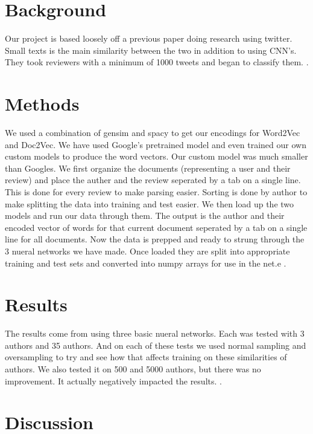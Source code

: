 \documentclass[conference]{IEEEtran}
\begin{document}
\section{Background}

Our project is based loosely off a previous paper doing research using twitter. Small texts is the main similarity between the two in addition to using CNN's. They took reviewers with a minimum of 1000 tweets and began to classify them. \cite{b2}.

\section{Methods}
We used a combination of gensim and spacy to get our encodings for Word2Vec and Doc2Vec. We have used Google's pretrained model and even trained our own custom models to produce the word vectors. Our custom model was much smaller than Googles. We first organize the documents (representing a user and their review) and place the auther and the review seperated by a tab on a single line. This is done for every review to make parsing easier. Sorting is done by author to make splitting the data into training and test easier. We then load up the two models and run our data through them. The output is the author and their encoded vector of words for that current document seperated by a tab on a single line for all documents. Now the data is prepped and ready to strung through the 3 nueral networks we have made. Once loaded they are split into appropriate training and test sets and converted into numpy arrays for use in the net.e \cite{b3}.

\section{Results}

The results come from using three basic nueral networks. Each was tested with 3 authors and 35 authors. And on each of these tests we used normal sampling and oversampling to try and see how that affects training on these similarities of authors. We also tested it on 500 and 5000 authors, but there was no improvement. It actually negatively impacted the results. \cite{b4}.

\section{Discussion}
\end{document}
